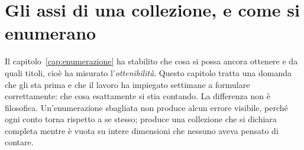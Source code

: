
\chapter{Gli assi di una collezione, e come si enumerano}
\label{cap:assi}

Il capitolo~\ref{cap:enumerazione} ha stabilito che cosa si possa ancora ottenere e da quali titoli, cioè ha misurato l'\emph{ottenibilità}. Questo capitolo tratta una domanda che gli sta prima e che il lavoro ha impiegato settimane a formulare correttamente: che cosa esattamente si stia contando. La differenza non è filosofica. Un'enumerazione sbagliata non produce alcun errore visibile, perché ogni conto torna rispetto a se stesso; produce una collezione che si dichiara completa mentre è vuota su intere dimensioni che nessuno aveva pensato di contare.

